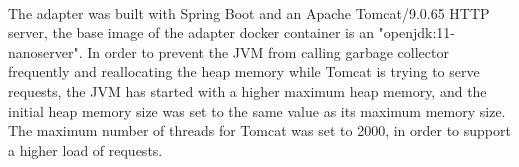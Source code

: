 \paragraph{}

The adapter was built with Spring Boot and an Apache Tomcat/9.0.65 HTTP server, the base image of the adapter docker container is an "openjdk:11-nanoserver".
In order to prevent the JVM from calling garbage collector frequently and reallocating the heap memory while Tomcat is trying to serve requests,
the JVM has started with a higher maximum heap memory, and the initial heap memory
size was set to the same value as its maximum memory size.
The maximum number of threads for Tomcat was set to 2000, in order to support a higher load of requests.


